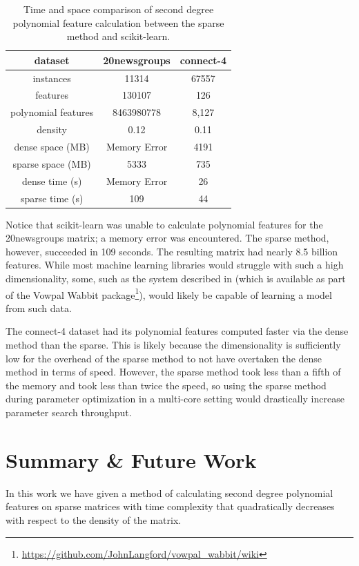 \documentclass[11pt,onecolumn]{article}
\begin{document}
\begin{table}
    \centering
    \begin{tabular}[numbered]{c | c | c} \label{table:results}
        dataset             & 20newsgroups  & connect-4 \\ \hline
        instances           & 11314        & 67557    \\ \hline
        features            & 130107       & 126       \\ \hline
        polynomial features & 8463980778 & 8,127     \\ \hline
        density             & 0.12          & 0.11      \\ \hline
        dense space (MB)    & Memory Error  & 4191      \\ \hline
        sparse space (MB)   & 5333          & 735       \\ \hline
        dense time (s)      & Memory Error  & 26        \\ \hline
        sparse time (s)     & 109           & 44        \\ \hline
    \end{tabular}
    \caption{Time and space comparison of second degree polynomial feature calculation between the sparse method and scikit-learn.}
\end{table}

Notice that scikit-learn was unable to calculate polynomial features for the 20newsgroups 
matrix; a memory error was encountered. The sparse method, however, succeeded in 109 seconds.
The resulting matrix had nearly 8.5 billion features. While most machine learning libraries would
struggle with such a high dimensionality, some, such as the system described in \cite{agarwal2014reliable} (which is 
available as part of the Vowpal Wabbit package\footnote{\url{https://github.com/JohnLangford/vowpal_wabbit/wiki}}), would likely be capable
of learning a model from such data.

The connect-4 dataset had its polynomial features computed faster via the dense method than the sparse. This
is likely because the dimensionality is sufficiently low for the overhead of the sparse method
to not have overtaken the dense method in terms of speed. However, the sparse method took less than
a fifth of the memory and took less than twice the speed, so using the sparse method during parameter 
optimization in a multi-core setting would drastically increase parameter search throughput.

\section{Summary \& Future Work}
In this work we have given a method of calculating second degree polynomial features on sparse matrices
with time complexity that quadratically decreases with respect to the density of the matrix.
\end{document}

